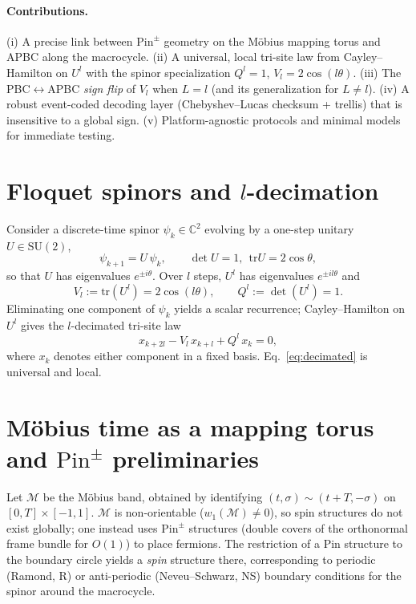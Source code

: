 \documentclass[aps,prb,twocolumn,superscriptaddress,nofootinbib,10pt]{revtex4-2}
\theoremstyle{definition}
\theoremstyle{remark}
\newcommand{\C}{\mathbb{C}}
\newcommand{\tr}{\mathrm{tr}}
\newcommand{\SU}{\mathrm{SU}}
\newcommand{\Pin}{\mathrm{Pin}}
\begin{document}
\paragraph*{Contributions.}
(i) A precise link between $\Pin^{\pm}$ geometry on the M\"obius mapping torus and APBC along the macrocycle.
(ii) A universal, local tri-site law from Cayley--Hamilton on $U^l$ with the spinor specialization $Q^l=1$, $V_l=2\cos(l\theta)$.
(iii) The PBC$\leftrightarrow$APBC \emph{sign flip} of $V_l$ when $L=l$ (and its generalization for $L\neq l$).
(iv) A robust event-coded decoding layer (Chebyshev--Lucas checksum + trellis) that is insensitive to a global sign.
(v) Platform-agnostic protocols and minimal models for immediate testing.

\section{Floquet spinors and $l$-decimation}
Consider a discrete-time spinor $\psi_k\in\C^2$ evolving by a one-step unitary $U\in\SU(2)$,
\begin{equation}\label{eq:step}
\psi_{k+1}=U\,\psi_k,\qquad \det U=1,\ \ \tr U=2\cos\theta,
\end{equation}
so that $U$ has eigenvalues $e^{\pm i\theta}$. Over $l$ steps, $U^l$ has eigenvalues $e^{\pm i l\theta}$ and
\begin{equation}\label{eq:Ul}
V_l:=\tr(U^l)=2\cos(l\theta),\qquad Q^l:=\det(U^l)=1.
\end{equation}
Eliminating one component of $\psi_k$ yields a scalar recurrence; Cayley--Hamilton on $U^l$ gives the $l$-decimated tri-site law
\begin{equation}\label{eq:decimated}
x_{k+2l}-V_l\,x_{k+l}+Q^l\,x_k=0,
\end{equation}
where $x_k$ denotes either component in a fixed basis. Eq.~\eqref{eq:decimated} is universal and local.

\section{M\"obius time as a mapping torus and $\Pin^{\pm}$ preliminaries}
Let $\mathcal{M}$ be the M\"obius band, obtained by identifying $(t,\sigma)\sim(t+T,-\sigma)$ on $[0,T]\times[-1,1]$.
$\mathcal{M}$ is non-orientable ($w_1(\mathcal{M})\neq 0$), so spin structures do not exist globally; one instead uses
$\Pin^{\pm}$ structures (double covers of the orthonormal frame bundle for $O(1)$) to place fermions.
The restriction of a $\Pin$ structure to the boundary circle yields a \emph{spin} structure there, corresponding to
periodic (Ramond, R) or anti-periodic (Neveu--Schwarz, NS) boundary conditions for the spinor around the macrocycle.
\end{document}
